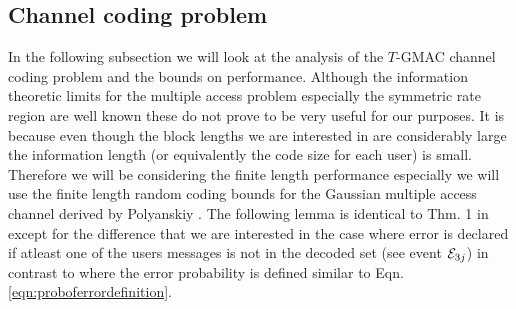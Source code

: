 \subsection{Channel coding problem}
In the following subsection we will look at the analysis of the $T$-GMAC channel coding problem and the bounds on performance. Although the information theoretic limits for the multiple access problem especially the symmetric rate region are well known these do not prove to be very useful for our purposes. It is because even though the block lengths we are interested in are considerably large the information length (or equivalently the code size for each user) is small. Therefore we will be considering the finite length performance especially we will use the finite length random coding bounds for the Gaussian multiple access channel derived by Polyanskiy \cite{polyanskiy2017perspective}. The following lemma is identical to Thm. 1 in \cite{polyanskiy2017perspective} except for the difference that we are interested in the case where error is declared if atleast one of the users messages is not in the decoded set (see event $\mathcal{E}_{3j}$) in contrast to \cite{polyanskiy2017perspective} where the error probability is defined similar to Eqn. \eqref{eqn:proboferrordefinition}.
